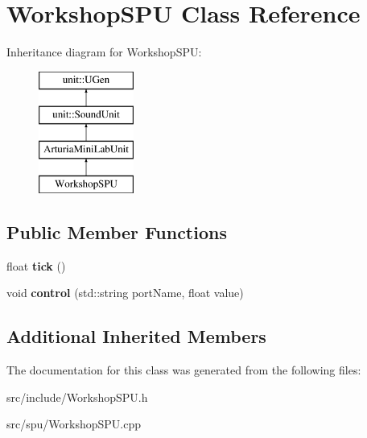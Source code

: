 \hypertarget{classWorkshopSPU}{\section{Workshop\-S\-P\-U Class Reference}
\label{classWorkshopSPU}
}
Inheritance diagram for Workshop\-S\-P\-U\-:\begin{figure}[H]
\begin{center}
\leavevmode
\includegraphics[height=4.000000cm]{classWorkshopSPU}
\end{center}
\end{figure}
\subsection*{Public Member Functions}
\begin{DoxyCompactItemize}
\item 
\hypertarget{classWorkshopSPU_a8721f1f7429f4b7f3ced46fc781674b7}{float {\bfseries tick} ()}\label{classWorkshopSPU_a8721f1f7429f4b7f3ced46fc781674b7}

\item 
\hypertarget{classWorkshopSPU_a72adc07c2054fd0cdfe623da30bb23ba}{void {\bfseries control} (std\-::string port\-Name, float value)}\label{classWorkshopSPU_a72adc07c2054fd0cdfe623da30bb23ba}

\end{DoxyCompactItemize}
\subsection*{Additional Inherited Members}


The documentation for this class was generated from the following files\-:\begin{DoxyCompactItemize}
\item 
src/include/Workshop\-S\-P\-U.\-h\item 
src/spu/Workshop\-S\-P\-U.\-cpp\end{DoxyCompactItemize}

